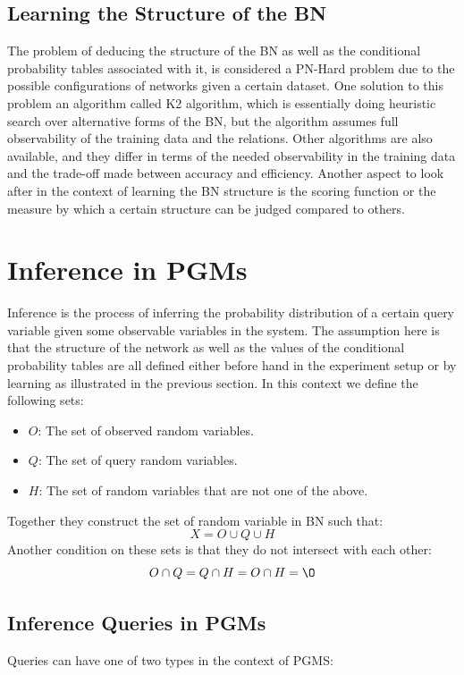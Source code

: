 \documentclass{article}
\begin{document}
\subsection{Learning the Structure of the BN}
The problem of deducing the structure of the BN as well as the conditional probability tables associated with it, is considered a PN-Hard problem due to the possible configurations of networks given a certain dataset. One solution to this problem an algorithm called K2 algorithm, which is essentially doing heuristic search over alternative forms of the BN, but the algorithm assumes full observability of the training data and the relations. Other algorithms are also available, and they differ in terms of the needed observability in the training data and the trade-off made between accuracy and efficiency. Another aspect to look after in the context of learning the BN structure is the scoring function or the measure by which a certain structure can be judged compared to others.
\section{Inference in PGMs}
Inference is the process of inferring the probability distribution of a certain query variable given some observable variables in the system. The assumption here is that the structure of the network as well as the values of the conditional probability tables are all defined either before hand in the experiment setup or by learning as illustrated in the previous section. In this context we define the following sets:
\begin{itemize}
\item $O$: The set of observed random variables.
\item $Q$: The set of query random variables.
\item $H$: The set of random variables that are not one of the above.
\end{itemize}
Together they construct the set of random variable in BN such that:
\begin{equation}
X = O \cup Q \cup H
\end{equation}
Another condition on these sets is that they do not intersect with each other:
\begin{equation}
O \cap Q = Q \cap H = O \cap H = \O
\end{equation}
\subsection{Inference Queries in PGMs}
Queries can have one of two types in the context of PGMS:\\ 
\end{document}
